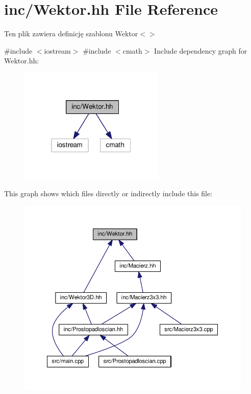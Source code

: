 \hypertarget{Wektor_8hh}{}\section{inc/\+Wektor.hh File Reference}
\label{Wektor_8hh}


Ten plik zawiera definicję szablonu Wektor$<$$>$  


{\ttfamily \#include $<$iostream$>$}\newline
{\ttfamily \#include $<$cmath$>$}\newline
Include dependency graph for Wektor.\+hh\+:\nopagebreak
\begin{figure}[H]
\begin{center}
\leavevmode
\includegraphics[width=196pt]{Wektor_8hh__incl}
\end{center}
\end{figure}
This graph shows which files directly or indirectly include this file\+:\nopagebreak
\begin{figure}[H]
\begin{center}
\leavevmode
\includegraphics[width=350pt]{Wektor_8hh__dep__incl}
\end{center}
\end{figure}
